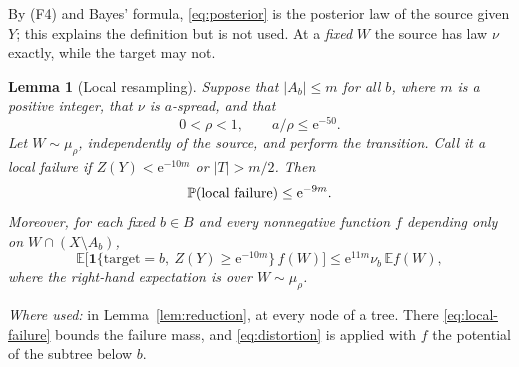 \documentclass[11pt]{article}
\newtheorem{lemma}[theorem]{Lemma}
\numberwithin{equation}{section}
\newcommand{\PP}{\mathbb P}
\newcommand{\EE}{\mathbb E}
\newcommand{\ind}{\mathbf 1}
\newcommand{\ee}{\mathrm e}
\begin{document}
By (F4) and Bayes' formula, \eqref{eq:posterior} is the posterior law of the
source given $Y$; this explains the definition but is not used. At a
\emph{fixed} $W$ the source has law $\nu$ exactly, while the target may not.

\begin{lemma}[Local resampling]\label{lem:local}
Suppose that $|A_b|\le m$ for all $b$, where $m$ is a positive integer, that
$\nu$ is $a$-spread, and that
\[
 0<\rho<1,\qquad a/\rho\le\ee^{-50}.
\]
Let $W\sim\mu_\rho$, independently of the source, and perform the transition.
Call it a \emph{local failure} if $Z(Y)<\ee^{-10m}$ or $|T|>m/2$. Then
\begin{equation}\label{eq:local-failure}
 \PP(\textup{local failure})\le\ee^{-9m}.
\end{equation}
Moreover, for each fixed $b\in B$ and every nonnegative function
$f$ depending only on $W\cap(X\setminus A_b)$,
\begin{equation}\label{eq:distortion}
 \EE\bigl[\ind\{\mathrm{target}=b,\ Z(Y)\ge\ee^{-10m}\}\, f(W)\bigr]
 \le \ee^{11m}\nu_b\,\EE f(W),
\end{equation}
where the right-hand expectation is over $W\sim\mu_\rho$.
\end{lemma}

\emph{Where used:} in Lemma~\ref{lem:reduction}, at every node of a tree.
There \eqref{eq:local-failure} bounds the failure mass, and
\eqref{eq:distortion} is applied with $f$ the potential of the subtree below $b$.
\end{document}
